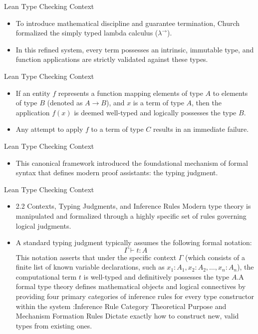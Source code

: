 \documentclass[10pt]{beamer}
\begin{document}
\begin{frame}{Lean Type Checking Context}
\begin{itemize}\setlength{\itemsep}{1.5em}
  \item To introduce mathematical discipline and guarantee termination, Church formalized the simply typed lambda calculus ($\lambda^{\to}$).
  \item In this refined system, every term possesses an intrinsic, immutable type, and function applications are strictly validated against these types.
\end{itemize}
\end{frame}

\begin{frame}{Lean Type Checking Context}
\begin{itemize}\setlength{\itemsep}{1.5em}
  \item If an entity $f$ represents a function mapping elements of type $A$ to elements of type $B$ (denoted as $A \to B$), and $x$ is a term of type $A$, then the application $f(x)$ is deemed well-typed and logically possesses the type $B$.
  \item Any attempt to apply $f$ to a term of type $C$ results in an immediate failure.
\end{itemize}
\end{frame}

\begin{frame}{Lean Type Checking Context}
\begin{itemize}\setlength{\itemsep}{1.5em}
  \item This canonical framework introduced the foundational mechanism of formal syntax that defines modern proof assistants: the typing judgment.
\end{itemize}
\end{frame}

\begin{frame}{Lean Type Checking Context}
\begin{itemize}\setlength{\itemsep}{1.5em}
  \item 2.2 Contexts, Typing Judgments, and Inference Rules Modern type theory is manipulated and formalized through a highly specific set of rules governing logical judgments.
  \item A standard typing judgment typically assumes the following formal notation:$$\Gamma \vdash t : A$$
This notation asserts that under the specific context $\Gamma$ (which consists of a finite list of known variable declarations, such as $x_1 : A_1, x_2 : A_2, \dots, x_n : A_n$), the computational term $t$ is well-typed and definitively possesses the type $A$.A formal type theory defines mathematical objects and logical connectives by providing four primary categories of inference rules for every type constructor within the system :Inference Rule Category Theoretical Purpose and Mechanism Formation Rules Dictate exactly how to construct new, valid types from existing ones.
\end{itemize}
\end{frame}
\end{document}
